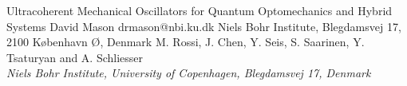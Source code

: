 \begin{conf-abstract}[]
{Ultracoherent Mechanical Oscillators for Quantum Optomechanics and Hybrid Systems}
{\color{blue} David Mason}
{drmason@nbi.ku.dk}
{Niels Bohr Institute, Blegdamsvej 17, 2100 København Ø, Denmark}
{{\color{blue}M. Rossi, J. Chen, Y. Seis, S. Saarinen, Y. Tsaturyan and A. Schliesser}\\ \textit{Niels Bohr Institute, University of Copenhagen, Blegdamsvej 17, Denmark}\\ 
\decofourleft \decofourright}





\printbibliography[heading=none]

\end{conf-abstract}
